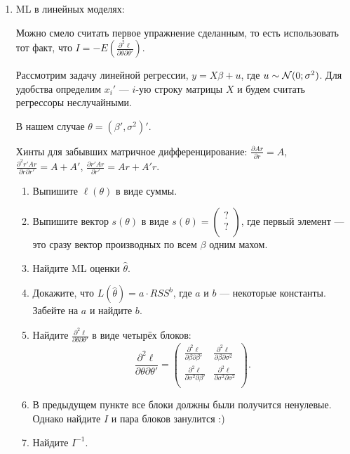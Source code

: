 \documentclass[12pt, a4paper]{article}\usepackage[]{graphicx}\usepackage[]{color}
\begin{document}
\begin{enumerate}
\begin{enumerate}
\end{enumerate}

\item ML в линейных моделях:

Можно смело считать первое упражнение сделанным, то есть использовать тот факт, что $I=-E(\frac{\partial^2 \ell}{\partial \theta\partial\theta'})$.

Рассмотрим задачу линейной регрессии, $y=X\beta+u$, где $u\sim \mathcal{N}(0;\sigma^2)$. Для удобства определим $x_i'$ — $i$-ую строку матрицы $X$ и будем считать регрессоры неслучайными.

В нашем случае $\theta=(\beta', \sigma^2)'$.


Хинты для забывших матричное дифференцирование: $\frac{\partial Ar}{\partial r}=A$, $\frac{\partial^2 r'Ar}{\partial r\partial r'}=A+A'$, $\frac{\partial r'Ar}{\partial r'}=Ar+A'r$.

\begin{enumerate}
\item Выпишите $\ell(\theta)$ в виде суммы.
\item Выпишите вектор $s(\theta)$ в виде
$s(\theta) = \begin{pmatrix}
? \\
? \\
\end{pmatrix}$, где первый элемент — это сразу вектор производных по всем $\beta$ одним махом.
\item Найдите ML оценки $\hat\theta$.
\item Докажите, что $L(\hat\theta)=a \cdot RSS^{b}$, где $a$ и $b$ — некоторые константы. Забейте на $a$ и найдите $b$.
\item Найдите $\frac{\partial^2 \ell}{\partial \theta\partial\theta'}$ в виде четырёх блоков:
\[
\frac{\partial^2 \ell}{\partial \theta\partial\theta'}=\begin{pmatrix}
\frac{\partial^2 \ell}{\partial \beta\partial\beta'} & \frac{\partial^2 \ell}{\partial \beta\partial \sigma^2} \\
\frac{\partial^2 \ell}{\partial \sigma^2\partial\beta'} & \frac{\partial^2 \ell}{\partial \sigma^2\partial\sigma^2} \\
\end{pmatrix}.
\]
\item В предыдущем пункте все блоки должны были получится ненулевые. Однако найдите $I$ и пара блоков занулится :)
\item Найдите $I^{-1}$.
\end{enumerate}


\end{enumerate}
\end{document}
